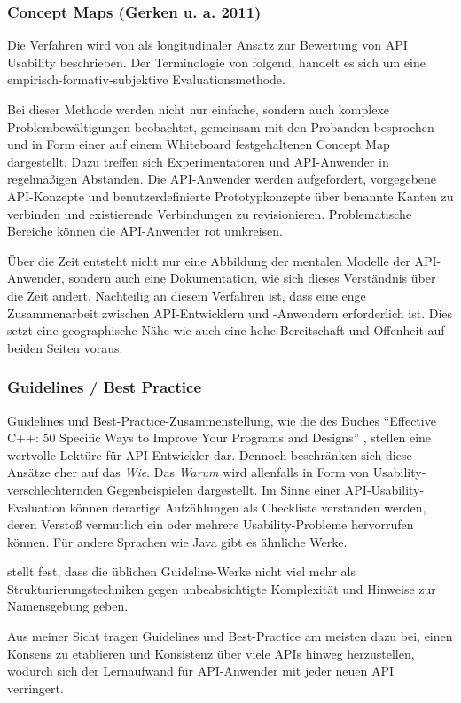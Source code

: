 \subsubsection{Concept Maps (Gerken u. a. 2011)}
\label{sec:concept-maps}
Die Verfahren wird von \cite{Tenny:2011jp} als longitudinaler Ansatz zur Bewertung von API Usability beschrieben. Der Terminologie von \cite{Sarodnick:2006vc} folgend, handelt es sich um eine empirisch-formativ-subjektive Evaluationsmethode.

Bei dieser Methode werden nicht nur einfache, sondern auch komplexe Problembewältigungen beobachtet, gemeinsam mit den Probanden besprochen und in Form einer auf einem Whiteboard festgehaltenen Concept Map dargestellt. Dazu treffen sich Experimentatoren und API-Anwender in regelmäßigen Abständen. Die API-Anwender werden aufgefordert, vorgegebene API-Konzepte und benutzerdefinierte Prototypkonzepte über benannte Kanten zu verbinden und existierende Verbindungen zu revisionieren. Problematische Bereiche können die API-Anwender rot umkreisen.
  
Über die Zeit entsteht nicht nur eine Abbildung der mentalen Modelle der API-Anwender, sondern auch eine Dokumentation, wie sich dieses Verständnis über die Zeit ändert. Nachteilig an diesem Verfahren ist, dass eine enge Zusammenarbeit zwischen API-Entwicklern und -Anwendern erforderlich ist. Dies setzt eine geographische Nähe wie auch eine hohe Bereitschaft und Offenheit auf beiden Seiten voraus.



\subsubsection{Guidelines / Best Practice}
Guidelines und Best-Practice-Zusammenstellung, wie die des Buches ``Effective C++: 50 Specific Ways to Improve Your Programs and Designs'' \citep{meyers1998effective}, stellen eine wertvolle Lektüre für API-Entwickler dar. Dennoch beschränken sich diese Ansätze eher auf das \textit{Wie}. Das \textit{Warum} wird allenfalls in Form von Usability-verschlechternden Gegenbeispielen dargestellt. Im Sinne einer API-Usability-Evaluation können derartige Aufzählungen als Checkliste verstanden werden, deren Verstoß vermutlich ein oder mehrere Usability-Probleme hervorrufen können. Für andere Sprachen wie Java \citep{bloch2008effective} gibt es ähnliche Werke.

\cite{Robillard:2010bh} stellt fest, dass die üblichen Guideline-Werke nicht viel mehr als Strukturierungstechniken gegen unbeabsichtigte Komplexität und Hinweise zur Namensgebung geben.
  
Aus meiner Sicht tragen Guidelines und Best-Practice am meisten dazu bei, einen Konsens zu etablieren und Konsistenz über viele APIs hinweg herzustellen, wodurch sich der Lernaufwand für API-Anwender mit jeder neuen API verringert.